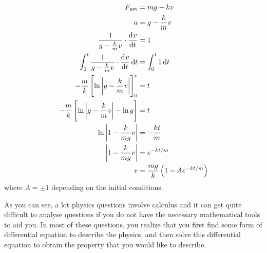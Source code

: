 \documentclass[answers]{exam}
\begin{document}
\begin{questions}
{		\begin{solution}
		\par
			\vspace{-3.4em}
			\begin{align*}
				F_\text{net} &= mg - kv \\
				a &= g - \frac{k}{m} v\\
				\frac{1}{g-\frac{k}{m} v} \cdot \dod{v}{t} &= 1 \\
				\int^t_0 \frac{1}{g-\frac{k}{m} v} \cdot \dod{v}{t} \dif{t} &= \int^t_0 1 \dif{t} \\
				-\frac{m}{k}\left[\ln{\left| g - \frac{k}{m}v \right|}\right]^v_0 &= t \\
				-\frac{m}{k}\left[\ln{\left| g - \frac{k}{m}v \right|} - \ln{g}\right] &= t \\ 
				\ln{\left| 1 - \frac{k}{mg}v \right|} &= -\frac{kt}{m} \\
				\left| 1 - \frac{k}{mg}v \right| &= e^{-kt/m} \\
				v &= \frac{mg}{k}\left(1-Ae^{-kt/m}\right)
			\end{align*}
			where $A = \pm 1$ depending on the initial conditions.
		\end{solution}
	}
\end{questions}

\ifprintanswers
	\vspace{5em}

	As you can see, a lot physics questions involve calculus and it can get quite difficult to analyse questions if you do not have the necessary mathematical tools to aid you. In most of these questions, you realize that you first find some form of differential equation to describe the physics, and then solve this differential equation to obtain the property that you would like to describe. 
\fi
\end{document}
